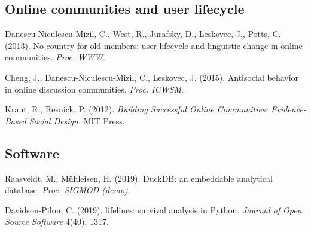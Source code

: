 \documentclass[11pt,a4paper]{article}
\begin{document}
\subsection*{Online communities and user lifecycle}
\begin{enumerate}[label={[\arabic*]},ref=\arabic*,resume=refs]
  \item\label{ref:dnm} Danescu-Niculescu-Mizil, C., West, R., Jurafsky, D., Leskovec, J., Potts, C. (2013). No country for old members: user lifecycle and linguistic change in online communities. \emph{Proc. WWW}.
  \item\label{ref:cheng} Cheng, J., Danescu-Niculescu-Mizil, C., Leskovec, J. (2015). Antisocial behavior in online discussion communities. \emph{Proc. ICWSM}.
  \item\label{ref:kraut} Kraut, R., Resnick, P. (2012). \emph{Building Successful Online Communities: Evidence-Based Social Design.} MIT Press.
\end{enumerate}

\subsection*{Software}
\begin{enumerate}[label={[\arabic*]},ref=\arabic*,resume=refs]
  \item\label{ref:duckdb} Raasveldt, M., M\"uhleisen, H. (2019). DuckDB: an embeddable analytical database. \emph{Proc. SIGMOD (demo)}.
  \item\label{ref:lifelines} Davidson-Pilon, C. (2019). lifelines: survival analysis in Python. \emph{Journal of Open Source Software} 4(40), 1317.
\end{enumerate}

\appendix
\end{document}
